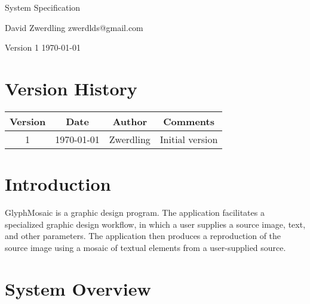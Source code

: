 \documentclass{article}
\newcommand{\docauth}[2]{
  \raggedright
  \Large
  {#1} \newline
  \small
  {#2}
  \vspace{1.5em}
  \newline
  \normalsize
}
\begin{document}
\begin{titlepage}
  \begin{center}
    \LARGE
    System Specification
  \end{center}

  \vfill

  \docauth{David Zwerdling}{zwerdlds@gmail.com}

  \vspace{1em}

  \large
  Version 1 \newline
  \today
  \normalsize
\end{titlepage}
\restoregeometry

\newpage



\section{Version History}
\begin{adjustbox}{width=\textwidth}
  \begin{tabular}{ |c|c|c|c| }
    \hline
    Version & Date   & Author      & Comments          \\
    \hline
    \hline
    1       & \today & {Zwerdling} & {Initial version} \\
    \hline
  \end{tabular}
\end{adjustbox}
\newpage



\tableofcontents \newpage



\section{Introduction}
GlyphMosaic is a graphic design program.
The application facilitates a specialized graphic design workflow, in which a user supplies a source image, text, and other parameters.
The application then produces a reproduction of the source image using a mosaic of textual elements from a user-supplied source.


\section{System Overview}
\end{document}

